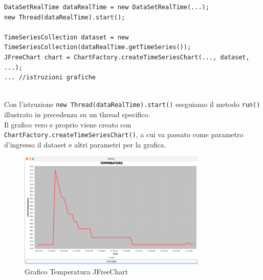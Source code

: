 \begin{lstlisting}[autogobble, title={\texttt{DataSetRealTime.java}}]
DataSetRealTime dataRealTime = new DataSetRealTime(...);
new Thread(dataRealTime).start();

TimeSeriesCollection dataset = new TimeSeriesCollection(dataRealTime.getTimeSeries());
JFreeChart chart = ChartFactory.createTimeSeriesChart(..., dataset, ...);
... //istruzioni grafiche
\end{lstlisting}
\\
Con l'istruzione \texttt{new Thread(dataRealTime).start()} eseguiamo il metodo \texttt{run()}
illustrato in precedenza su un thread specifico.\\
Il grafico vero e proprio viene creato con \texttt{ChartFactory.createTimeSeriesChart()}, a cui
va passato come parametro d'ingresso il dataset e altri parametri per la grafica.

\begin{figure}[H]
    \begin{center}
        \includegraphics[width=0.8\textwidth]{img/chartTemperature}
    \end{center}
    \caption{Grafico Temperatura JFreeChart}
\end{figure}

